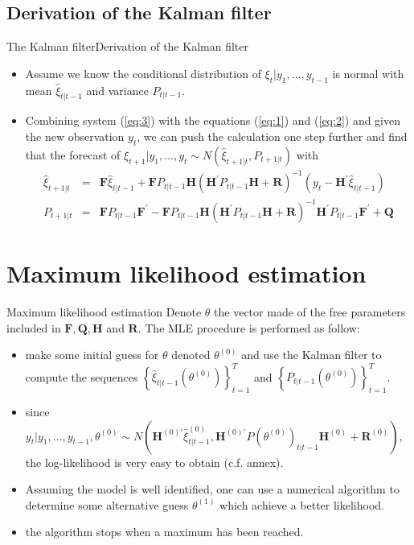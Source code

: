 \documentclass[10pt]{beamer}
\begin{document}
\subsection{Derivation of the Kalman filter}
%
%
\begin{frame}{The Kalman filter}{Derivation of the Kalman filter}
%
%
%
\begin{itemize}
%
\item Assume we know the conditional distribution of $\xi_{t}\vert y_{1}, \ldots, y_{t-1}$ is normal with mean $\hat\xi_{t\vert t-1}$ and variance $P_{t\vert t-1}$. 
%
\item Combining system (\ref{eq:3}) with the equations (\ref{eq:1}) and (\ref{eq:2}) and given the new observation $y_{t}$, we can push the calculation one step further and find that the forecast of $\xi_{t+1}\vert y_{1}, \ldots, y_{t}\sim N(\hat\xi_{t+1\vert t}, P_{t+1\vert t})$ with
%
\begin{eqnarray*}
\hat\xi_{t+1\vert t} & = & \mathbf F \hat\xi_{t\vert t-1} + \mathbf F P_{t\vert t-1} \mathbf H(\mathbf H^{'}P_{t\vert t-1}\mathbf H + \mathbf R)^{-1}(y_{t} - \mathbf H^{'}\hat\xi_{t\vert t-1})\\
P_{t+1\vert t} & = & \mathbf F P_{t\vert t-1} \mathbf F^{'} - \mathbf F P_{t\vert t-1}\mathbf H(\mathbf H^{'}P_{t\vert t-1}\mathbf H + \mathbf R)^{-1}\mathbf H^{'}P_{t\vert t-1}\mathbf F^{'} + \mathbf Q
\end{eqnarray*}
%
\end{itemize}
%
\end{frame}
%
\section{Maximum likelihood estimation}
%
%
\begin{frame}{Maximum likelihood estimation}{}
%
%
%
Denote $\theta$ the vector made of the free parameters included in $\mathbf F, \mathbf Q, \mathbf H$ and $\mathbf R$. The MLE procedure is performed as follow:
\begin{itemize}
%
\item make some initial guess for $\theta$ denoted $\theta^{(0)}$ and use the Kalman filter to compute the sequences $\left\{\hat\xi_{t\vert t-1}(\theta^{(0)})\right\}^{T}_{t=1}$ and $\left\{P_{t\vert t-1}(\theta^{(0)})\right\}^{T}_{t=1}$.
%
\item since $y_{t}\vert y_{1},\ldots,y_{t-1},\theta^{(0)}\sim N(\mathbf H^{(0)'}\hat\xi^{(0)}_{t\vert t-1}, \mathbf H^{(0)'}P{(\theta^{(0)})}_{t\vert t-1}\mathbf H^{(0)} + \mathbf R^{(0)})$, the log-likelihood is very easy to obtain (c.f. annex).
%
\item Assuming the model is well identified, one can use a numerical algorithm to determine some alternative guess $\theta^{(1)}$ which achieve a better likelihood.
\item the algorithm stops when a maximum has been reached.
%
\end{itemize}
%
\end{frame}
%
\end{document}
